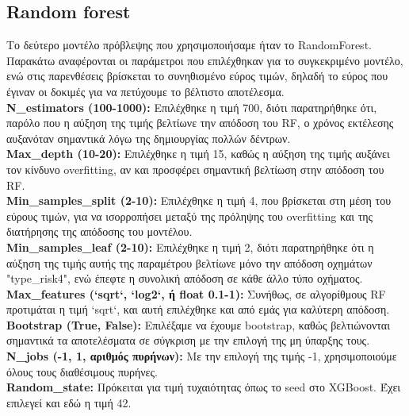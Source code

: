 \documentclass{llncs}
\begin{document}
\subsection{Random forest}
Το δεύτερο μοντέλο πρόβλεψης που χρησιμοποιήσαμε ήταν το RandomForest. Παρακάτω αναφέρονται οι παράμετροι που επιλέχθηκαν για το συγκεκριμένο μοντέλο, ενώ στις παρενθέσεις βρίσκεται το συνηθισμένο εύρος τιμών, δηλαδή το εύρος που έγιναν οι δοκιμές για να πετύχουμε το βέλτιστο αποτέλεσμα.\\


\noindent \textbf{N\_estimators (100-1000):}
Επιλέχθηκε η τιμή 700, διότι παρατηρήθηκε ότι, παρόλο που η αύξηση της τιμής βελτίωνε την απόδοση του RF, ο χρόνος εκτέλεσης αυξανόταν σημαντικά λόγω της δημιουργίας πολλών δέντρων.\\

\noindent \textbf{Max\_depth (10-20):}
Επιλέχθηκε η τιμή 15, καθώς η αύξηση της τιμής αυξάνει τον κίνδυνο overfitting, αν και προσφέρει σημαντική βελτίωση στην απόδοση του RF. \\

\noindent \textbf{Min\_samples\_split (2-10):}
Επιλέχθηκε η τιμή 4, που βρίσκεται στη μέση του εύρους τιμών, για να ισορροπήσει μεταξύ της πρόληψης του overfitting και της διατήρησης της απόδοσης του μοντέλου.\\

\noindent \textbf{Min\_samples\_leaf (2-10):}
Επιλέχθηκε η τιμή 2, διότι παρατηρήθηκε ότι η αύξηση της τιμής αυτής της παραμέτρου βελτίωνε μόνο την απόδοση οχημάτων "type\_risk4", ενώ έπεφτε η συνολική απόδοση σε κάθε άλλο τύπο οχήματος. \\

\noindent \textbf{Max\_features (`sqrt`, `log2`, ή float 0.1-1):}
Συνήθως, σε αλγορίθμους RF προτιμάται η τιμή `sqrt`, και αυτή επιλέχθηκε και από εμάς για καλύτερη απόδοση. \\

\noindent \textbf{Bootstrap (True, False):}
Επιλέξαμε να έχουμε bootstrap, καθώς βελτιώνονται σημαντικά τα αποτελέσματα σε σύγκριση με την επιλογή της μη ύπαρξης τους.\\

\noindent \textbf{N\_jobs (-1, 1, αριθμός πυρήνων):}
Με την επιλογή της τιμής -1, χρησιμοποιούμε όλους τους διαθέσιμους πυρήνες.\\

\noindent \textbf{Random\_state:}
Πρόκειται για τιμή τυχαιότητας όπως το seed στο XGBoost. Έχει επιλεγεί και εδώ η τιμή 42.\\
\end{document}
